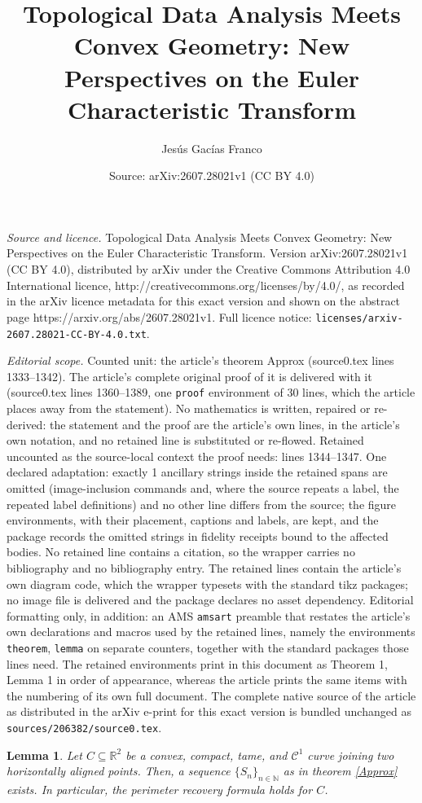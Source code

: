 \documentclass[10pt,a4paper]{amsart}
\title{Topological Data Analysis Meets Convex Geometry: New Perspectives on the Euler Characteristic Transform}
\author{Jes\'us Gac\'ias Franco}
\date{Source: arXiv:2607.28021v1 (CC BY 4.0)}
\newtheorem{lemma}{Lemma}
\newcommand{\bb}{\mathbb}
\begin{document}
\maketitle

\noindent\emph{Source and licence.} Topological Data Analysis Meets Convex Geometry: New Perspectives on the Euler Characteristic Transform. Version arXiv:2607.28021v1 (CC BY 4.0), distributed by arXiv under the Creative Commons Attribution 4.0 International licence, http://creativecommons.org/licenses/by/4.0/, as recorded in the arXiv licence metadata for this exact version and shown on the abstract page https://arxiv.org/abs/2607.28021v1. Full licence notice: \texttt{licenses/arxiv-2607.28021-CC-BY-4.0.txt}.\par\smallskip

\noindent\textit{Editorial scope.} Counted unit: the article's theorem Approx (source0.tex lines 1333--1342). The article's complete original proof of it is delivered with it (source0.tex lines 1360--1389, one \texttt{proof} environment of 30 lines, which the article places away from the statement). No mathematics is written, repaired or re-derived: the statement and the proof are the article's own lines, in the article's own notation, and no retained line is substituted or re-flowed.  Retained uncounted as the source-local context the proof needs: lines 1344--1347.  One declared adaptation: exactly 1 ancillary strings inside the retained spans are omitted (image-inclusion commands and, where the source repeats a label, the repeated label definitions) and no other line differs from the source; the figure environments, with their placement, captions and labels, are kept, and the package records the omitted strings in fidelity receipts bound to the affected bodies.  No retained line contains a citation, so the wrapper carries no bibliography and no bibliography entry.  The retained lines contain the article's own diagram code, which the wrapper typesets with the standard tikz packages; no image file is delivered and the package declares no asset dependency.  Editorial formatting only, in addition: an AMS \texttt{amsart} preamble that restates the article's own declarations and macros used by the retained lines, namely the environments \texttt{theorem}, \texttt{lemma} on separate counters, together with the standard packages those lines need.  The retained environments print in this document as Theorem 1, Lemma 1 in order of appearance, whereas the article prints the same items with the numbering of its own full document.  The complete native source of the article as distributed in the arXiv e-print for this exact version is bundled unchanged as \texttt{sources/206382/source0.tex}.
\begin{lemma}
	\label{ConvexCurve}
	Let $C \subseteq \bb R^2$ be a convex, compact, tame, and $\mathcal C^1$ curve joining two horizontally aligned points. Then, a sequence $\{S_n\}_{n \in \bb N}$ as in theorem \ref{Approx} exists. In particular, the perimeter recovery formula holds for $C$.
\end{lemma}
\end{document}
